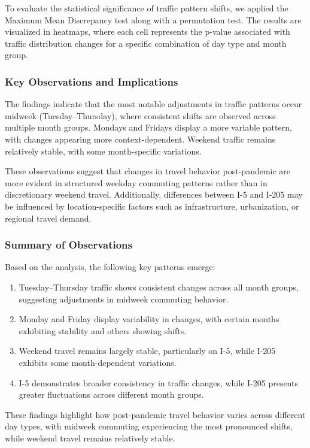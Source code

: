 \documentclass{article}
\begin{document}
To evaluate the statistical significance of traffic pattern shifts, we applied the Maximum Mean Discrepancy test along with a permutation test. The results are visualized in heatmaps, where each cell represents the p-value associated with traffic distribution changes for a specific combination of day type and month group.

\subsubsection{Key Observations and Implications}

The findings indicate that the most notable adjustments in traffic patterns occur midweek (Tuesday–Thursday), where consistent shifts are observed across multiple month groups. Mondays and Fridays display a more variable pattern, with changes appearing more context-dependent. Weekend traffic remains relatively stable, with some month-specific variations.

These observations suggest that changes in travel behavior post-pandemic are more evident in structured weekday commuting patterns rather than in discretionary weekend travel. Additionally, differences between I-5 and I-205 may be influenced by location-specific factors such as infrastructure, urbanization, or regional travel demand.

\subsubsection{Summary of Observations}

Based on the analysis, the following key patterns emerge:

\begin{enumerate}
    \item Tuesday–Thursday traffic shows consistent changes across all month groups, suggesting adjustments in midweek commuting behavior.
    \item Monday and Friday display variability in changes, with certain months exhibiting stability and others showing shifts.
    \item Weekend travel remains largely stable, particularly on I-5, while I-205 exhibits some month-dependent variations.
    \item I-5 demonstrates broader consistency in traffic changes, while I-205 presents greater fluctuations across different month groups.
\end{enumerate}

These findings highlight how post-pandemic travel behavior varies across different day types, with midweek commuting experiencing the most pronounced shifts, while weekend travel remains relatively stable.
\end{document}
